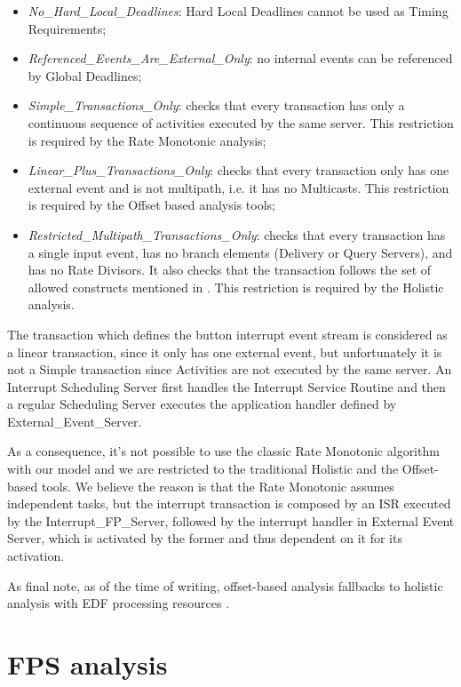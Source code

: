 \documentclass{article}
\begin{document}
\begin{itemize}
   \item \textit{No\_Hard\_Local\_Deadlines}: Hard Local Deadlines cannot be used as Timing Requirements;
   \item \textit{Referenced\_Events\_Are\_External\_Only}: no internal events can be referenced by Global Deadlines;
   \item \textit{Simple\_Transactions\_Only}: checks that every transaction has only a continuous sequence of activities executed by the same server. This restriction is required by the Rate Monotonic analysis;
   \item \textit{Linear\_Plus\_Transactions\_Only}: checks that every transaction only has one external event and is not multipath, i.e. it has no Multicasts. This restriction is required by the Offset based analysis tools;
   \item \textit{Restricted\_Multipath\_Transactions\_Only}: checks that every transaction has a single input event, has no branch elements (Delivery or Query Servers), and has no Rate Divisors. It also checks that the transaction follows the set of allowed constructs mentioned in \cite{mast-restrictions}. This restriction is required by the Holistic analysis.
\end{itemize}

The transaction which defines the button interrupt event stream is considered as a linear transaction, since it only has one external event, but unfortunately it is not a Simple transaction since Activities are not executed by the same server. An Interrupt Scheduling Server first handles the Interrupt Service Routine and then a regular Scheduling Server executes the application handler defined by External\_Event\_Server.

As a consequence, it's not possible to use the classic Rate Monotonic algorithm \cite{rm-dm} with our model and we are restricted to the traditional Holistic and the Offset-based tools. We believe the reason is that the Rate Monotonic assumes independent tasks, but the interrupt transaction is composed by an ISR executed by the Interrupt\_FP\_Server, followed by the interrupt handler in External Event Server, which is activated by the former and thus dependent on it for its activation.

As final note, as of the time of writing, offset-based analysis fallbacks to holistic analysis with EDF processing resources \cite{mast-analysis}.

\section{FPS analysis}
\end{document}
